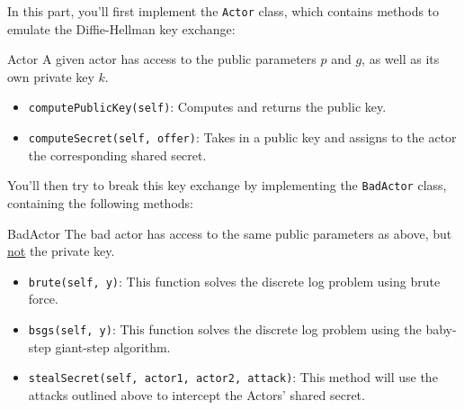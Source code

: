 \documentclass{article}
\begin{document}
    \begin{tcolorbox}[enhanced,interior style={top color=Plum!20,bottom color=Plum!30}]
        In this part, you'll first implement the \lstinline{Actor} class, which contains methods to emulate the Diffie-Hellman key exchange:
    
        \begin{mybox}[
            colframe=Cerulean!50!black,
            colback=Cerulean!30,
            colbacktitle=Cerulean!,
            coltitle=Cerulean!30!black
            ]{Actor}
            A given actor has access to the public parameters $p$ and $g$, as well as its own private key $k$.
            \begin{itemize}
                \item \lstinline{computePublicKey(self)}: Computes and returns the public key.
                \item \lstinline{computeSecret(self, offer)}: Takes in a public key and assigns to the actor the corresponding shared secret.
            \end{itemize}
    
        \end{mybox}
    
        You'll then try to break this key exchange by implementing the \lstinline{BadActor} class, containing the following methods:
    
        \begin{mybox}[
            colframe=purple!50!black,
            colback=purple!30,
            colbacktitle=purple!50!white,
            coltitle=purple!30!black,
            ]{BadActor}
            The bad actor has access to the same public parameters as above, but \underline{not} the private key.
            \begin{itemize}
                \item \lstinline{brute(self, y)}: This function solves the discrete log problem using brute force.
                \item \lstinline{bsgs(self, y)}: This function solves the discrete log problem using the baby-step giant-step algorithm.
                \item \lstinline{stealSecret(self, actor1, actor2, attack)}: This method will use the attacks outlined above to intercept the Actors' shared secret.
            \end{itemize}
            

\end{mybox}
\end{tcolorbox}
\end{document}
